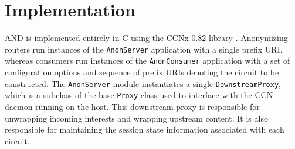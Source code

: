 \section{Implementation} \label{sec:introduction}
{\sf AND} is implemented entirely in C using the CCNx 0.82 library \cite{ccnx}. Anonymizing routers run instances of the {\tt AnonServer} application with a single prefix URI, whereas consumers run instances of the {\tt AnonConsumer} application with a set of configuration options and sequence of prefix URIs denoting the circuit to be constructed. The {\tt AnonServer} module instantiates a single {\tt DownstreamProxy}, which is a subclass of the base {\tt Proxy} class used to interface with the CCN daemon running on the host. This downstream proxy is responsible for unwrapping incoming interests and wrapping upstream content. It is also responsible for maintaining the session state information associated with each circuit.
